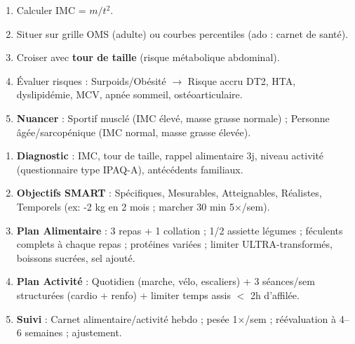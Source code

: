 \documentclass[11pt]{article}
\begin{document}
\begin{bilan}
\begin{methode}
  \begin{enumerate}
    \item Calculer IMC = $m/t^2$.
    \item Situer sur grille OMS (adulte) ou courbes percentiles (ado : carnet de santé).
    \item Croiser avec \textbf{tour de taille} (risque métabolique abdominal).
    \item Évaluer risques : Surpoids/Obésité $\rightarrow$ Risque accru DT2, HTA, dyslipidémie, MCV, apnée sommeil, ostéoarticulaire.
    \item \textbf{Nuancer} : Sportif musclé (IMC élevé, masse grasse normale) ; Personne âgée/sarcopénique (IMC normal, masse grasse élevée).
  \end{enumerate}
\end{methode}

\begin{methode}
  \begin{enumerate}
    \item \textbf{Diagnostic} : IMC, tour de taille, rappel alimentaire 3j, niveau activité (questionnaire type IPAQ-A), antécédents familiaux.
    \item \textbf{Objectifs SMART} : Spécifiques, Mesurables, Atteignables, Réalistes, Temporels (ex: -2 kg en 2 mois ; marcher 30 min 5×/sem).
    \item \textbf{Plan Alimentaire} : 3 repas + 1 collation ; 1/2 assiette légumes ; féculents complets à chaque repas ; protéines variées ; limiter ULTRA-transformés, boissons sucrées, sel ajouté.
    \item \textbf{Plan Activité} : Quotidien (marche, vélo, escaliers) + 3 séances/sem structurées (cardio + renfo) + limiter temps assis $<$ 2h d'affilée.
    \item \textbf{Suivi} : Carnet alimentaire/activité hebdo ; pesée 1×/sem ; réévaluation à 4--6 semaines ; ajustement.
  \end{enumerate}
\end{methode}

\end{bilan}
\end{document}

